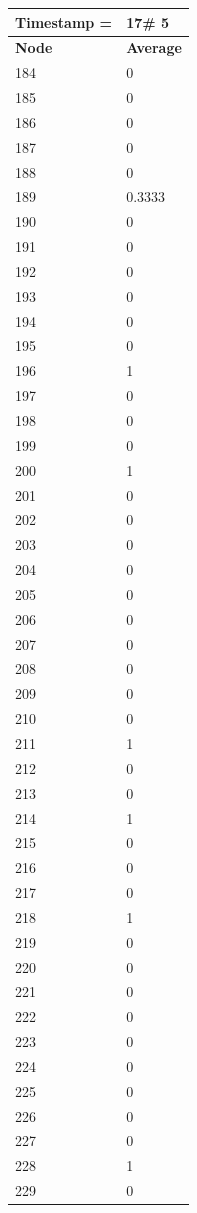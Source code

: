 \begin{tabular}{|l||l|}
\hline
\textbf{Timestamp =} & \textbf{17}\# 5\\\hline
	\textbf{Node} & \textbf{Average} \\ \hline
\hline
	184 & 0 \\ \hline
	185 & 0 \\ \hline
	186 & 0 \\ \hline
	187 & 0 \\ \hline
	188 & 0 \\ \hline
	189 & 0.3333 \\ \hline
	190 & 0 \\ \hline
	191 & 0 \\ \hline
	192 & 0 \\ \hline
	193 & 0 \\ \hline
	194 & 0 \\ \hline
	195 & 0 \\ \hline
	196 & 1 \\ \hline
	197 & 0 \\ \hline
	198 & 0 \\ \hline
	199 & 0 \\ \hline
	200 & 1 \\ \hline
	201 & 0 \\ \hline
	202 & 0 \\ \hline
	203 & 0 \\ \hline
	204 & 0 \\ \hline
	205 & 0 \\ \hline
	206 & 0 \\ \hline
	207 & 0 \\ \hline
	208 & 0 \\ \hline
	209 & 0 \\ \hline
	210 & 0 \\ \hline
	211 & 1 \\ \hline
	212 & 0 \\ \hline
	213 & 0 \\ \hline
	214 & 1 \\ \hline
	215 & 0 \\ \hline
	216 & 0 \\ \hline
	217 & 0 \\ \hline
	218 & 1 \\ \hline
	219 & 0 \\ \hline
	220 & 0 \\ \hline
	221 & 0 \\ \hline
	222 & 0 \\ \hline
	223 & 0 \\ \hline
	224 & 0 \\ \hline
	225 & 0 \\ \hline
	226 & 0 \\ \hline
	227 & 0 \\ \hline
	228 & 1 \\ \hline
	229 & 0 \\ \hline
\end{tabular}
